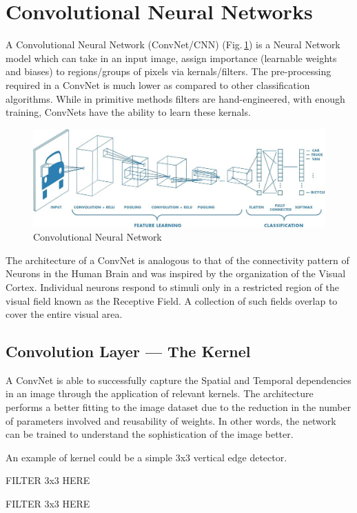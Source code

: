 \section{Convolutional Neural Networks}
A Convolutional Neural Network (ConvNet/CNN) (Fig.\,\ref{cnn}) is a Neural Network model which can take in an input image, assign importance (learnable weights and biases) to regions/groups of pixels via kernals/filters. The pre-processing required in a ConvNet is much lower as compared to other classification algorithms. While in primitive methods filters are hand-engineered, with enough training, ConvNets have the ability to learn these kernals.
\begin{figure}[h]
	\centering
	\includegraphics[width=\textwidth]{Figs/cnn.jpg}
    \caption{Convolutional Neural Network}
    \label{cnn}
\end{figure}

The architecture of a ConvNet is analogous to that of the connectivity pattern of Neurons in the Human Brain and was inspired by the organization of the Visual Cortex. Individual neurons respond to stimuli only in a restricted region of the visual field known as the Receptive Field. A collection of such fields overlap to cover the entire visual area.

\subsection{Convolution Layer — The Kernel}
A ConvNet is able to successfully capture the Spatial and Temporal dependencies in an image through the application of relevant kernels. The architecture performs a better fitting to the image dataset due to the reduction in the number of parameters involved and reusability of weights. In other words, the network can be trained to understand the sophistication of the image better.

An example of kernel could be a simple 3x3 vertical edge detector.

FILTER 3x3 HERE

FILTER 3x3 HERE

